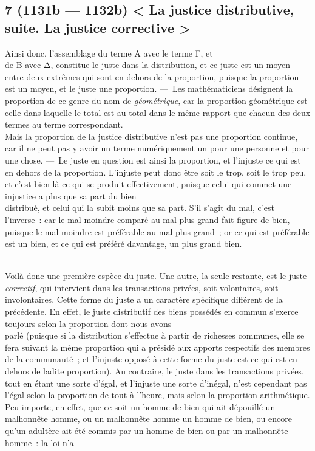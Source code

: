 \documentclass[french,twoside]{book} %
\begin{document}
\subsection[{7 (1131b — 1132b) < La justice distributive, suite. La justice corrective >}]{7 (1131b — 1132b) < La justice distributive, suite. La justice corrective >}
\noindent Ainsi donc, l’assemblage du terme A avec le terme Γ, et \\
de B avec Δ, constitue le juste dans la distribution, et ce juste est un moyen entre deux extrêmes qui sont en dehors de la proportion, puisque la proportion est un moyen, et le juste une proportion. — Les mathématiciens désignent la proportion de ce genre du nom de {\itshape géométrique}, car la proportion géométrique est celle dans laquelle le total est au total dans le même rapport que chacun des deux termes au terme correspondant. \\
Mais la proportion de la justice distributive n’est pas une proportion continue, car il ne peut pas y avoir un terme numériquement un pour une personne et pour une chose. — Le juste en question est ainsi la proportion, et l’injuste ce qui est en dehors de la proportion. L’injuste peut donc être soit le trop, soit le trop peu, et c’est bien là ce qui se produit effectivement, puisque celui qui commet une injustice a plus que sa part du bien \\
distribué, et celui qui la subit moins que sa part. S’il s’agit du mal, c’est l’inverse : car le mal moindre comparé au mal plus grand fait figure de bien, puisque le mal moindre est préférable au mal plus grand ; or ce qui est préférable est un bien, et ce qui est préféré davantage, un plus grand bien.\par
\\
Voilà donc une première espèce du juste. Une autre, la seule restante, est le juste {\itshape correctif}, qui intervient dans les transactions privées, soit volontaires, soit involontaires. Cette forme du juste a un caractère spécifique différent de la précédente. En effet, le juste distributif des biens possédés en commun s’exerce toujours selon la proportion dont nous avons \\
parlé (puisque si la distribution s’effectue à partir de richesses communes, elle se fera suivant la même proportion qui a présidé aux apports respectifs des membres de la communauté ; et l’injuste opposé à cette forme du juste est ce qui est en dehors de ladite proportion). Au contraire, le juste dans les transactions privées, tout en étant une sorte d’égal, et l’injuste  une sorte d’inégal, n’est cependant pas l’égal selon la proportion de tout à l’heure, mais selon la proportion arithmétique. Peu importe, en effet, que ce soit un homme de bien qui ait dépouillé un malhonnête homme, ou un malhonnête homme un homme de bien, ou encore qu’un adultère ait été commis par un homme de bien ou par un malhonnête homme : la loi n’a \\
\end{document}
